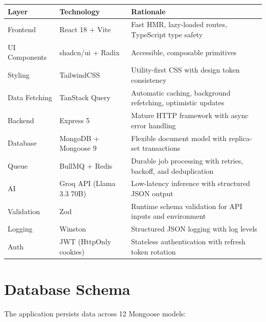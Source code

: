 \documentclass[12pt,a4paper]{article}
\begin{document}
\begin{longtable}{p{3.5cm} p{3.5cm} p{7cm}}
\toprule
\textbf{Layer} & \textbf{Technology} & \textbf{Rationale} \\
\midrule
Frontend & React 18 + Vite & Fast HMR, lazy-loaded routes, TypeScript type safety \\
UI Components & shadcn/ui + Radix & Accessible, composable primitives \\
Styling & TailwindCSS & Utility-first CSS with design token consistency \\
Data Fetching & TanStack Query & Automatic caching, background refetching, optimistic updates \\
Backend & Express 5 & Mature HTTP framework with async error handling \\
Database & MongoDB + Mongoose 9 & Flexible document model with replica-set transactions \\
Queue & BullMQ + Redis & Durable job processing with retries, backoff, and deduplication \\
AI & Groq API (Llama 3.3 70B) & Low-latency inference with structured JSON output \\
Validation & Zod & Runtime schema validation for API inputs and environment \\
Logging & Winston & Structured JSON logging with log levels \\
Auth & JWT (HttpOnly cookies) & Stateless authentication with refresh token rotation \\
\bottomrule
\end{longtable}

\section{Database Schema}

The application persists data across 12 Mongoose models:
\end{document}
